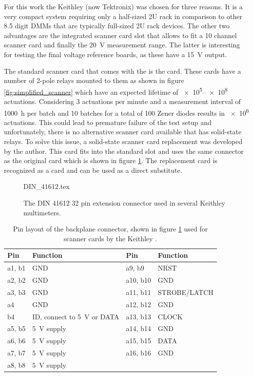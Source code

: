 For this work the Keithley (now Tektronix)  was chosen for three reasons. It is a very compact system requiring only a half-sized 2U rack in comparison to other \num{8.5} digit DMMs that are typically full-sized 2U rack devices. The other two advantages are the integrated scanner card slot that allows to fit a 10 channel scanner card and finally the \qty{20}{\volt} measurement range. The latter is interesting for testing the final voltage reference boards, as these have a \qty{15}{\volt} output.

The standard scanner card that comes with the  is the  card. These cards have a number of 2-pole relays mounted to them as shown in figure \ref{fig:simplified_scanner} which have an expected lifetime of \numrange[range-phrase={~to~}]{e5}{e8} actuations. Considering \num{3} actuations per minute and a measurement interval of \qty{1000}{\hour} per batch and \num{10} batches for a total of \num{100} Zener diodes results in \num{e6} actuations. This could lead to premature failure of the test setup and unfortunately, there is no alternative scanner card available that has solid-state relays. To solve this issue, a solid-state scanner card replacement was developed by the author. This card fits into the standard slot and uses the same connector as the original card which is shown in figure \ref{fig:connector_scan2000}. The replacement card is recognized as a  card and can be used as a direct substitute.
\begin{figure}[ht]
    \centering
    {DIN_41612.tex}
    \caption{The DIN 41612 \num{32} pin extension connector used in several Keithley multimeters.}
    \label{fig:connector_scan2000}
\end{figure}
\begin{table}[ht]
    \centering
    \begin{tabular}{llll}
        \toprule
        Pin& Function& Pin& Function\\
        \midrule
        a1, b1& GND& a9, b9& $\overline{\text{NRST}}$\\
        a2, b2& GND& a10, b10& GND\\
        a3, b3& GND& a11, b11& STROBE/LATCH\\
        a4    & GND& a12, b12& GND\\
        b4    & ID, connect to \qty{5}{\V} or DATA& a13, b13& CLOCK\\
        a5, b5& \qty{5}{\V} supply& a14, b14& GND\\
        a6, b6& \qty{5}{\V} supply& a15, b15& DATA\\
        a7, b7& \qty{5}{\V} supply& a16, b16& GND\\
        a8, b8& \qty{5}{\V} supply&&\\
        \bottomrule
    \end{tabular}
    \caption{Pin layout of the backplane connector, shown in figure \ref{fig:connector_scan2000} used for scanner cards by the Keithley .}
    \label{tab:connector_scan2000}
\end{table}

